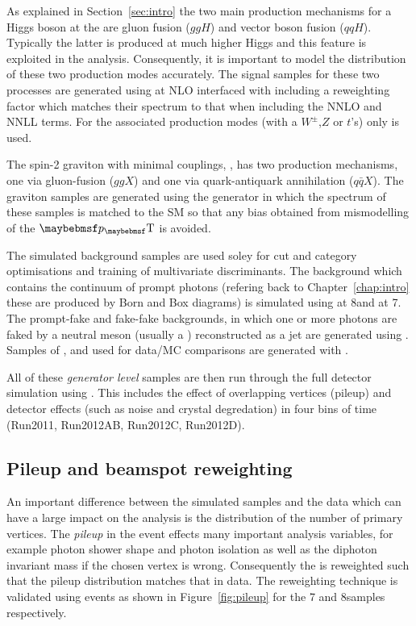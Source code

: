 As explained in Section~\ref{sec:intro} the two main production mechanisms for a \SM Higgs boson at the \LHC are gluon fusion ($ggH$) and vector boson fusion ($qqH$). Typically the latter is produced at much higher Higgs \pT and this feature is exploited in the analysis. Consequently, it is important to model the \pT distribution of these two production modes accurately. The signal samples for these two processes are generated using \POWHEG {} at NLO interfaced with \PYTHIA {} including a reweighting factor which matches their \pT spectrum to that when including the NNLO and NNLL terms. For the associated production modes (with a $W^{\pm}$,$Z$ or $t$'s) only \PYTHIA is used.

The spin-2 graviton with minimal couplings, \graviton, has two production mechanisms, one via gluon-fusion ($ggX$) and one via quark-antiquark annihilation ($q\bar{q}X$). The graviton samples are generated using the \JHU generator  in which the \pT spectrum of these samples is matched to the SM so that any bias obtained from mismodelling of the $\pT$ is avoided.

The simulated background samples are used soley for cut and category optimisations and training of multivariate discriminants. The background which contains the \QCD continuum of prompt photons (refering back to Chapter~\ref{chap:intro} these are produced by Born and Box diagrams) is simulated using \SHERPA at 8\TeV and \MADGRAPH at 7\TeV. The prompt-fake and fake-fake backgrounds, in which one or more photons are faked by a neutral meson (usually a \pizero) reconstructed as a jet are generated using \PYTHIA. Samples of \Zee, \Zmumu and \Zmumugamma used for data/MC comparisons are generated with \POWHEG.

All of these \emph{generator level} samples are then run through the full \CMS detector simulation using \GEANT {}. This includes the effect of overlapping vertices (pileup) and detector effects (such as noise and crystal degredation) in four bins of time (Run2011, Run2012AB, Run2012C, Run2012D).


\subsection{Pileup and beamspot reweighting}
\label{sec:pileup_beamspot}

An important difference between the simulated samples and the data which can have a large impact on the analysis is the distribution of the number of primary vertices. The \emph{pileup} in the event effects many important analysis variables, for example photon shower shape and photon isolation as well as the diphoton invariant mass if the chosen vertex is wrong. Consequently the \MC is reweighted such that the pileup distribution matches that in data. The reweighting technique is validated using \Zmumu events as shown in Figure~\ref{fig:pileup} for the 7 and 8\TeV samples respectively. 

